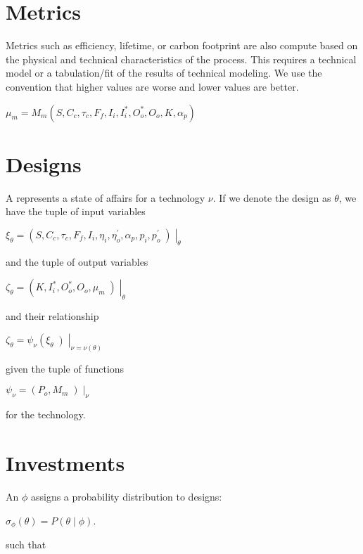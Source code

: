 \documentclass[letterpaper,10pt,english]{sphinxmanual}
\begin{document}
\section{Metrics}
\label{\detokenize{formulation:metrics}}
\sphinxAtStartPar
Metrics such as efficiency, lifetime, or carbon footprint are also
compute based on the physical and technical characteristics of the
process. This requires a technical model or a tabulation/fit of the
results of technical modeling. We use the convention that higher values
are worse and lower values are better.

\sphinxAtStartPar
\(\mu_m = M_m(S, C_c, \tau_c, F_f, I_i, I^*_i, O^*_o, O_o, K, \alpha_p)\)


\section{Designs}
\label{\detokenize{formulation:designs}}
\sphinxAtStartPar
A  represents a state of affairs for a technology \(\nu\).
If we denote the design as \(\theta\), we have the tuple of input
variables

\sphinxAtStartPar
\(\xi_\theta = \left(S, C_c, \tau_c, F_f, I_i, \eta_i, \eta^\prime_o, \alpha_p, p_i, p^\prime_o\middle) \right|_\theta\)

\sphinxAtStartPar
and the tuple of output variables

\sphinxAtStartPar
\(\zeta_\theta = \left(K, I^*_i, O^*_o, O_o, \mu_m\middle) \right|_\theta\)

\sphinxAtStartPar
and their relationship

\sphinxAtStartPar
\(\zeta_\theta = \psi_\nu\left(\xi_\theta\middle) \right|_{\nu = \nu(\theta)}\)

\sphinxAtStartPar
given the tuple of functions

\sphinxAtStartPar
\(\psi_\nu = \left(P_o, M_m\middle) \right|_\nu\)

\sphinxAtStartPar
for the technology.


\section{Investments}
\label{\detokenize{formulation:investments}}
\sphinxAtStartPar
An  \(\phi\) assigns a probability distribution to
designs:

\sphinxAtStartPar
\(\sigma_\phi(\theta) = P\left(\theta \middle| \phi\right)\).

\sphinxAtStartPar
such that
\end{document}
